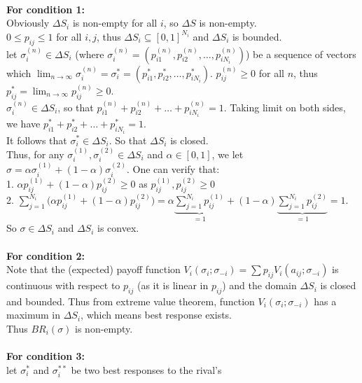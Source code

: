 \documentclass[twoside]{article}
\theoremstyle{definitionstyle}
\begin{document}
\\
\textbf{For condition 1:} \\
Obviously \(\Delta S_i\) is non-empty for all $i$, so \(\Delta S\) is non-empty.\\
\(0 \le p_{ij} \le 1\) for all $i,j$, thus \(\Delta S_i \subseteq [0,1]^{N_i}\) and \(\Delta S_i\) is bounded.\\
let \(\sigma_i^{(n)} \in \Delta S_i\) (where \(\sigma_i^{(n)} = (p_{i1}^{(n)}, p_{i2}^{(n)}, \dots, p_{iN_i}^{(n)})\)) be a sequence of vectors which \(\lim_{n\to\infty} \sigma_i^{(n)} = \sigma_i^* = (p_{i1}^*, p_{i2}^*, \dots, p_{iN_i}^*)\). 
\(p_{ij}^{(n)} \ge 0\) for all \(n\), thus \(p_{ij}^* = \lim_{n\to\infty} p_{ij}^{(n)} \ge 0\).\\
\(\sigma_i^{(n)} \in \Delta S_i\), so that $p_{i1}^{(n)} + p_{i2}^{(n)} + \dots + p_{iN_i}^{(n)} = 1$. Taking limit on both sides, we have $p_{i1}^* + p_{i2}^* + \dots + p_{iN_i}^* = 1$.\\
It follows that \(\sigma_i^* \in \Delta S_i\). So that \(\Delta S_i\) is closed.\\
Thus, for any \(\sigma_i^{(1)}, \sigma_i^{(2)} \in \Delta S_i\) and \(\alpha \in [0,1]\), we let \(\sigma = \alpha\sigma_i^{(1)} + (1 - \alpha)\sigma_i^{(2)}\). One can verify that:\\
1. \(\alpha p_{ij}^{(1)} + (1 - \alpha)p_{ij}^{(2)} \ge 0\) as \(p_{ij}^{(1)}, p_{ij}^{(2)} \ge 0\)\\
2. \(\displaystyle \sum_{j=1}^{N_i} \bigl(\alpha p_{ij}^{(1)} + (1 - \alpha)p_{ij}^{(2)}\bigr) = \alpha \underbrace{\sum_{j=1}^{N_i} p_{ij}^{(1)}}_{=1} + (1 - \alpha) \underbrace{\sum_{j=1}^{N_i} p_{ij}^{(2)}}_{=1} = 1\).\\
So \(\sigma \in \Delta S_i\) and \(\Delta S_i\) is convex.\\
\\
\textbf{For condition 2: }\\
Note that the (expected) payoff function $V_i(\sigma_i; \sigma_{-i}) = \sum p_{ij} V_i(a_{ij}; \sigma_{-i})$ is continuous with respect to $p_{ij}$ (as it is linear in $p_{ij}$) and the domain \(\Delta S_i\) is closed and bounded. 
Thus from extreme value theorem, function $V_i(\sigma_i; \sigma_{-i})$ has a maximum in \(\Delta S_i\), which means best response exists. \\
Thus $BR_i(\sigma)$ is non-empty. \\
\\
\textbf{For condition 3: }\\
let \(\sigma_i^*\) and \(\sigma_i^{**}\) be two best responses to the rival’s 
\end{document}
